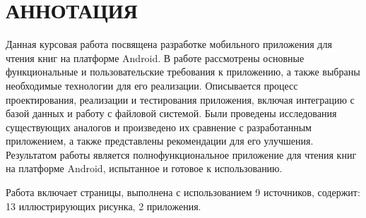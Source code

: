 \chapter*{АННОТАЦИЯ}

Данная курсовая работа посвящена разработке мобильного приложения
для чтения книг на платформе Android. В работе рассмотрены основные
функциональные и пользовательские требования к приложению,
а также выбраны необходимые технологии для его реализации.
Описывается процесс проектирования, реализации и тестирования приложения,
включая интеграцию с базой данных и работу с файловой системой.
Были проведены исследования существующих аналогов и произведено
их сравнение с разработанным приложением, а также представлены
рекомендации для его улучшения. Результатом работы является
полнофункциональное приложение для чтения книг на платформе Android,
испытанное и готовое к использованию.\par
Работа включает \pageref{lastpage} страницы, выполнена с использованием 9
источников, содержит: 13 иллюстрирующих рисунка, 2 приложения.
